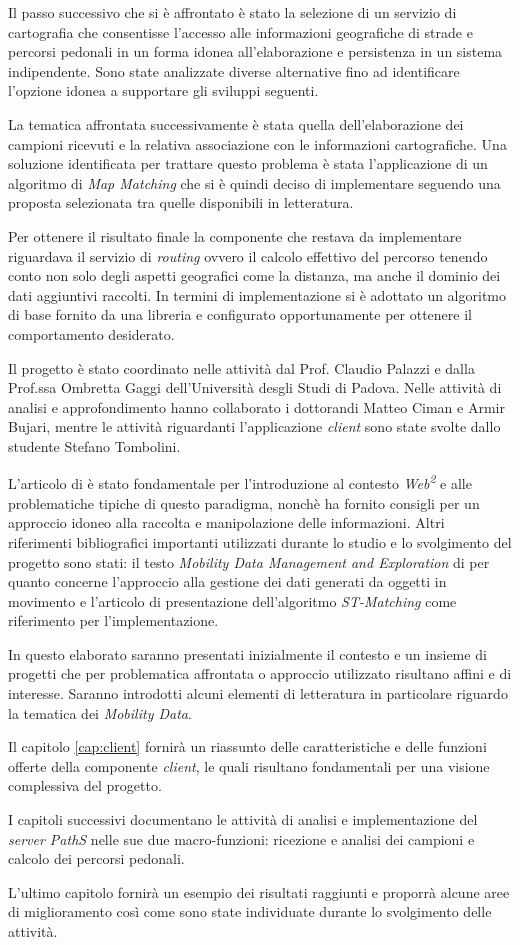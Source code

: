 Il passo successivo che si è affrontato è stato la selezione di un servizio di cartografia che consentisse l'accesso alle informazioni geografiche di strade e percorsi pedonali in un forma idonea all'elaborazione e persistenza in un sistema indipendente. Sono state analizzate diverse alternative fino ad identificare l'opzione idonea a supportare gli sviluppi seguenti.

La tematica affrontata successivamente è stata quella dell'elaborazione dei campioni ricevuti e la relativa associazione con le informazioni cartografiche. Una soluzione identificata per trattare questo problema è stata l'applicazione di un algoritmo di \emph{Map Matching} che si è quindi deciso di implementare seguendo una proposta selezionata tra quelle disponibili in letteratura.

Per ottenere il risultato finale la componente che restava da implementare riguardava il servizio di \emph{routing} ovvero il calcolo effettivo del percorso tenendo conto non solo degli aspetti geografici come la distanza, ma anche il dominio dei dati aggiuntivi raccolti. In termini di implementazione si è adottato un algoritmo di base fornito da una libreria e configurato opportunamente per ottenere il comportamento desiderato.

Il progetto è stato coordinato nelle attività dal Prof. Claudio Palazzi e dalla Prof.ssa Ombretta Gaggi dell'Università desgli Studi di Padova. Nelle attività di analisi e approfondimento hanno collaborato i dottorandi Matteo Ciman e Armir Bujari, mentre le attività riguardanti l'applicazione \emph{client} sono state svolte dallo studente Stefano Tombolini.

L'articolo di \textcite{web2palazzi} è stato fondamentale per l'introduzione al contesto \emph{Web\textsuperscript{2}} e alle problematiche tipiche di questo paradigma, nonchè ha fornito consigli per un approccio idoneo alla raccolta e manipolazione delle informazioni.
Altri riferimenti bibliografici importanti utilizzati durante lo studio e lo svolgimento del progetto sono stati: il testo \textit{Mobility Data Management and Exploration} di \textcite{mdme} per quanto concerne l'approccio alla gestione dei dati generati da oggetti in movimento e l'articolo di presentazione dell'algoritmo \emph{ST-Matching} come riferimento per l'implementazione.

In questo elaborato saranno presentati inizialmente il contesto e un insieme di progetti che per problematica affrontata o approccio utilizzato risultano affini e di interesse. Saranno introdotti alcuni elementi di letteratura in particolare riguardo la tematica dei \emph{Mobility Data}.

Il capitolo \ref{cap:client} fornirà un riassunto delle caratteristiche e delle funzioni offerte della componente \emph{client}, le quali risultano fondamentali per una visione complessiva del progetto.

I capitoli successivi documentano le attività di analisi e implementazione del \emph{server PathS} nelle sue due macro-funzioni: ricezione e analisi dei campioni e calcolo dei percorsi pedonali.

L'ultimo capitolo fornirà un esempio dei risultati raggiunti e proporrà alcune aree di miglioramento così come sono state individuate durante lo svolgimento delle attività.
